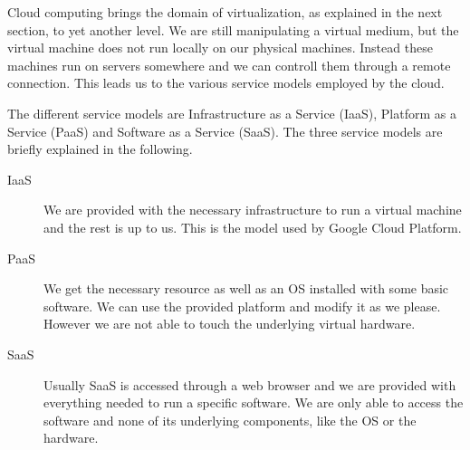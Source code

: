 Cloud computing brings the domain of virtualization, as explained in
the next section, to yet another level. We are still manipulating a
virtual medium, but the virtual machine does not run locally on our
physical machines. Instead these machines run on servers somewhere and
we can controll them through a remote connection. This leads us to the
various service models employed by the cloud.

The different service models are Infrastructure as a Service (IaaS),
Platform as a Service (PaaS) and Software as a Service (SaaS). The
three service models are briefly explained in the following.
\begin{description}

	\item[IaaS] We are provided with the necessary infrastructure to
	run a virtual machine and the rest is up to us.  This is the model
	used by Google Cloud Platform.

	\item[PaaS] We get the necessary resource as well as an OS
	installed with some basic software. We can use the provided platform
	and modify it as we please. However we are not able to touch the
	underlying virtual hardware.

	\item[SaaS] Usually SaaS is accessed through a web browser and we
	are provided with everything needed to run a specific software. We
	are only able to access the software and none of its underlying
	components, like the OS or the hardware.

\end{description}
